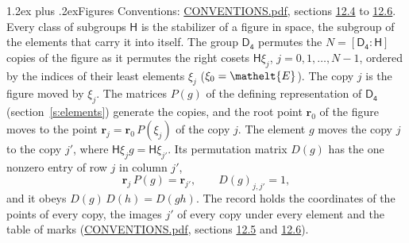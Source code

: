 \documentclass[10pt,a4paper]{article}
\makeatletter
\renewcommand\section{\@startsection{section}{1}{\z@}{-3ex plus -1ex minus -.2ex}%
  {1.2ex plus .2ex}{\normalfont\large\sffamily\bfseries\color{parttitle}}}
\numberwithin{equation}{section}
\newcommand{\eltfont}[1]{{\let\sigma\eltsigma\mathelt{#1}}}
\newcommand{\grp}[1]{\mathsf{#1}}
\newcommand{\cls}[1]{\eltfont{#1}}
\newcommand{\pointr}{\mathbf{r}}
\makeatother
\begin{document}
\section{Figures}\label{s:permutation}
Conventions: \href{../../CONVENTIONS.pdf}{CONVENTIONS.pdf}, sections \href{../../CONVENTIONS.pdf\#conv.12.4}{12.4} to \href{../../CONVENTIONS.pdf\#conv.12.6}{12.6}.
Every class of subgroups $\grp{H}$ is the stabilizer of a figure in space, the subgroup of the elements that carry it into itself. \label{n:local.orbit.size}\label{n:element.coset.least}\label{n:index.coset}The group $\grp{D_{4}}$ permutes the $N = [\grp{D_{4}} : \grp{H}]$ copies of the figure as it permutes the right cosets $\grp{H}\xi_j$, $j = 0, 1, \dots, N - 1$, ordered by the indices of their least elements $\xi_j$ ($\xi_0 = \cls{E}$). The copy $j$ is the figure moved by $\xi_j$. The matrices $P(g)$ of the defining representation of $\grp{D_{4}}$ (section~\ref{s:elements}) generate the copies, and the root point $\pointr_0$ of the figure moves to the point $\pointr_j = \pointr_0\, P(\xi_j)$ of the copy $j$. \label{n:local.coset.image}The element $g$ moves the copy $j$ to the copy $j'$, where $\grp{H}\xi_j g = \grp{H}\xi_{j'}$. \label{n:local.matrix.permutation}Its permutation matrix $D(g)$ has the one nonzero entry of row $j$ in column $j'$,
\begin{equation}\label{e:perm.matrix}\pointr_j\, P(g) = \pointr_{j'}, \qquad D(g)_{j,j'} = 1,\end{equation}
and it obeys $D(g)\, D(h) = D(gh)$. The record holds the coordinates of the points of every copy, the images $j'$ of every copy under every element and the table of marks (\href{../../CONVENTIONS.pdf}{CONVENTIONS.pdf}, sections \href{../../CONVENTIONS.pdf\#conv.12.5}{12.5} and \href{../../CONVENTIONS.pdf\#conv.12.6}{12.6}).
\end{document}
